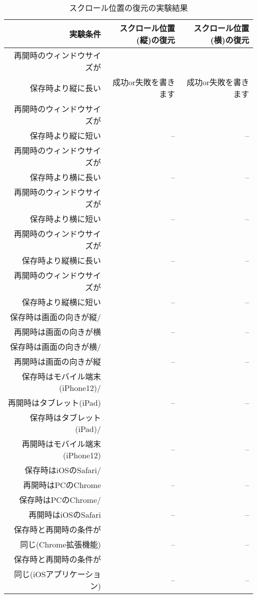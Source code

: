 \begin{table}[htbp]
  \caption{スクロール位置の復元の実験結果}
  \label{tb:evl-result-scroll-position}
  \begin{center}
    \begin{tabular}{rrr}
      \hline
      実験条件 & スクロール位置(縦)の復元 & スクロール位置(横)の復元 \\ \hline \hline
      再開時のウィンドウサイズが\\
      保存時より縦に長い & 成功or失敗を書きます & 成功or失敗を書きます \\ \hline
      再開時のウィンドウサイズが\\
      保存時より縦に短い & -- & -- \\ \hline
      再開時のウィンドウサイズが\\
      保存時より横に長い & -- & -- \\ \hline
      再開時のウィンドウサイズが\\
      保存時より横に短い & -- & -- \\ \hline
      再開時のウィンドウサイズが\\
      保存時より縦横に長い & -- & -- \\ \hline
      再開時のウィンドウサイズが\\
      保存時より縦横に短い & -- & -- \\ \hline
      保存時は画面の向きが縦/\\
      再開時は画面の向きが横 & -- & -- \\ \hline
      保存時は画面の向きが横/\\
      再開時は画面の向きが縦 & -- & -- \\ \hline
      保存時はモバイル端末(iPhone12)/\\
      再開時はタブレット(iPad) & -- & -- \\ \hline
      保存時はタブレット(iPad)/\\
      再開時はモバイル端末(iPhone12) & -- & -- \\ \hline
      保存時はiOSのSafari/\\
      再開時はPCのChrome & -- & -- \\ \hline
      保存時はPCのChrome/\\
      再開時はiOSのSafari & -- & -- \\ \hline
      保存時と再開時の条件が\\
      同じ(Chrome拡張機能) & -- & -- \\ \hline
      保存時と再開時の条件が\\
      同じ(iOSアプリケーション) & -- & -- \\ \hline
    \end{tabular}
  \end{center}
\end{table}
